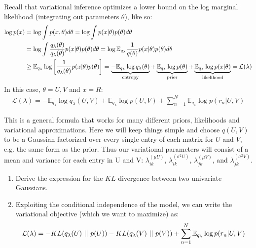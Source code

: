 \documentclass[submit]{harvardml}
\theoremstyle{plain}
\begin{document}
\begin{problem}

Recall that variational inference optimizes a lower bound on the log marginal likelihood (integrating out parameters $\theta$), like so:
\begin{align}
\log p(x) & = \log \int p(x, \theta) d\theta = \log \int p(x|\theta) p(\theta) d\theta \\
& = \log \int \frac{q_\lambda(\theta)}{q_\lambda(\theta)} p(x|\theta) p(\theta) d\theta
  = \log \mathbb{E}_{q_\lambda} \frac{1}{q(\theta)} p(x|\theta) p(\theta) d\theta \\
& \geq \mathbb{E}_{q_\lambda} \log \left[ \frac{1}{q_\lambda(\theta)} p(x|\theta) p(\theta) \right]
 = \underbrace{-\mathbb{E}_{q_\lambda} \log q_\lambda(\theta)}_{\textnormal{entropy}}  + \underbrace{\mathbb{E}_{q_\lambda} \log p(\theta)}_{\textnormal{prior}} + \underbrace{\mathbb{E}_{q_\lambda} \log p(x|\theta)}_{\textnormal{likelihood}}
= \mathcal{L}(\lambda)
\end{align}
%
In this case, $\theta = U,V$ and $x = R$:
%
\begin{align}
\mathcal{L}(\lambda) = -\mathbb{E}_{q_\lambda} \log q_\lambda(U, V) + \mathbb{E}_{q_\lambda} \log p(U, V) + \sum_{n=1}^N \mathbb{E}_{q_\lambda} \log p(r_n | U, V)
\end{align}
%

\noindent This is a general formula that works for many different priors, likelihoods and variational approximations. 
Here we will keep things simple and choose $q(U,V)$ to be a Gaussian factorized over every single entry of each matrix for $U$ and $V$, e.g. the same form as the prior.
Thus our variational parameters will consist of a mean and variance for each entry in U and V: $\lambda^{(\mu U)}_{ik}$, $\lambda^{(\sigma^2 U)}_{ik}$, $\lambda^{(\mu V)}_{jk}$, 
and $\lambda^{(\sigma^2 V)}_{jk}$.

\begin{enumerate}

\item Derive the expression for the $KL$ divergence between two univariate Gaussians.

\item Exploiting the conditional independence of the model, we can write the variational objective (which we want to maximize) as:
\[ {\cal L}(\lambda) = -KL(q_\lambda(U)\ ||\  p(U) ) - KL(q_\lambda(V)\ ||\ p(V)) + \sum_{n=1}^N \mathbb{E}_{q_\lambda} \log p(r_n | U, V)\]


\end{enumerate}
\end{problem}
\end{document}
